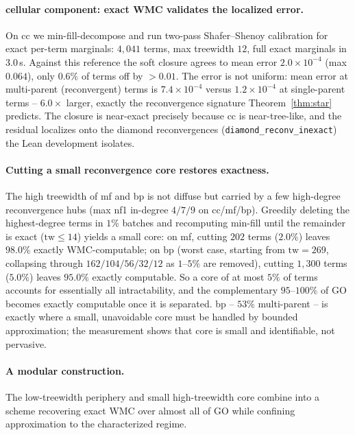 \documentclass[anon]{nesy2026}
\newcommand{\tw}{\ensuremath{\mathrm{tw}}}
\begin{document}
\paragraph{cellular component: exact WMC validates the localized error.}
On cc we min-fill-decompose and run two-pass Shafer--Shenoy calibration for exact per-term marginals: $4{,}041$ terms, max treewidth $12$, full exact marginals in $3.0$\,s. Against this reference the soft closure agrees to mean error $2.0\times10^{-4}$ (max $0.064$), only $0.6\%$ of terms off by ${>}0.01$. The error is not uniform: mean error at multi-parent (reconvergent) terms is $7.4\times10^{-4}$ versus $1.2\times10^{-4}$ at single-parent terms -- $6.0\times$ larger, exactly the reconvergence signature Theorem~\ref{thm:star} predicts. The closure is near-exact precisely because cc is near-tree-like, and the residual localizes onto the diamond reconvergences (\texttt{diamond\_reconv\_inexact}) the Lean development isolates.

\paragraph{Cutting a small reconvergence core restores exactness.}
The high treewidth of mf and bp is not diffuse but carried by a few high-degree reconvergence hubs (max nf1 in-degree $4/7/9$ on cc/mf/bp). Greedily deleting the highest-degree terms in $1\%$ batches and recomputing min-fill until the remainder is exact ($\tw\le14$) yields a small core: on mf, cutting $202$ terms ($2.0\%$) leaves $98.0\%$ exactly WMC-computable; on bp (worst case, starting from $\tw=269$, collapsing through $162/104/56/32/12$ as $1$--$5\%$ are removed), cutting $1{,}300$ terms ($5.0\%$) leaves $95.0\%$ exactly computable. So a core of at most $5\%$ of terms accounts for essentially all intractability, and the complementary $95$--$100\%$ of GO becomes exactly computable once it is separated. bp -- $53\%$ multi-parent -- is exactly where a small, unavoidable core must be handled by bounded approximation; the measurement shows that core is small and identifiable, not pervasive.

\paragraph{A modular construction.}
The low-treewidth periphery and small high-treewidth core combine into a scheme recovering exact WMC over almost all of GO while confining approximation to the characterized regime.
\end{document}
